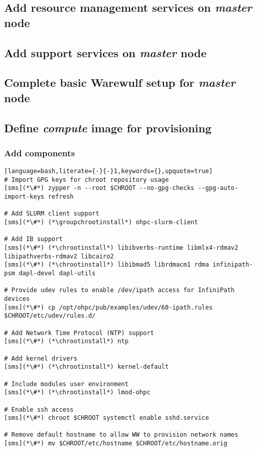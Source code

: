 \documentclass[letterpaper]{article}
\newcommand{\chrootinstall}{zypper -n --root \$CHROOT install}
\newcommand{\groupchrootinstall}{zypper -n --root \$CHROOT install -t pattern}
\begin{document}
\subsection{Add resource management services on {\em master} node} \label{sec:add_rm}


\subsection{Add \InfiniBand{} support services on {\em master} node} \label{sec:add_ofed}


\subsection{Complete basic Warewulf setup for {\em master} node} \label{sec:setup_ww}



\subsection{Define {\em compute} image for provisioning}


\subsubsection{Add \OHPC{} components} \label{sec:add_components}


\begin{lstlisting}[language=bash,literate={-}{-}1,keywords={},upquote=true]
# Import GPG keys for chroot repository usage
[sms](*\#*) zypper -n --root $CHROOT --no-gpg-checks --gpg-auto-import-keys refresh

# Add SLURM client support
[sms](*\#*) (*\groupchrootinstall*) ohpc-slurm-client

# Add IB support
[sms](*\#*) (*\chrootinstall*) libibverbs-runtime libmlx4-rdmav2 libipathverbs-rdmav2 libcairo2
[sms](*\#*) (*\chrootinstall*) libibmad5 librdmacm1 rdma infinipath-psm dapl-devel dapl-utils

# Provide udev rules to enable /dev/ipath access for InfiniPath devices
[sms](*\#*) cp /opt/ohpc/pub/examples/udev/60-ipath.rules $CHROOT/etc/udev/rules.d/

# Add Network Time Protocol (NTP) support
[sms](*\#*) (*\chrootinstall*) ntp

# Add kernel drivers
[sms](*\#*) (*\chrootinstall*) kernel-default

# Include modules user environment
[sms](*\#*) (*\chrootinstall*) lmod-ohpc

# Enable ssh access 
[sms](*\#*) chroot $CHROOT systemctl enable sshd.service

# Remove default hostname to allow WW to provision network names
[sms](*\#*) mv $CHROOT/etc/hostname $CHROOT/etc/hostname.orig
\end{lstlisting}
\end{document}
